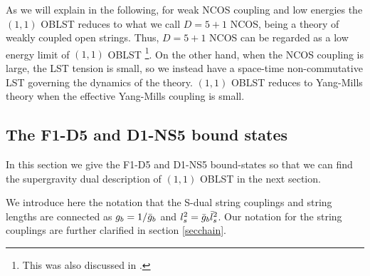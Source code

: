 \documentclass[a4paper,twoside,titlepage,12pt]{article}
\begin{document}
As we will explain in the following, 
for weak NCOS coupling and low energies the 
$(1,1)$ OBLST reduces to what we call
$D=5+1$ NCOS, being a theory of weakly coupled open strings.
Thus, $D=5+1$ NCOS can be regarded as a low energy limit of $(1,1)$ OBLST%
\footnote{This was also discussed in \cite{Harmark:2000wv}.}.
On the other hand, when the NCOS coupling is large, the LST tension
is small, so we instead have a space-time non-commutative 
LST governing the dynamics of the theory.
$(1,1)$ OBLST reduces to Yang-Mills theory when the effective Yang-Mills
coupling is small.

\subsection{The F1-D5 and D1-NS5 bound states}

In this section we give the F1-D5 and D1-NS5 bound-states 
so that we can find the supergravity dual description 
of $(1,1)$ OBLST in the next section.

We introduce here the notation that 
the S-dual string couplings and string lengths are connected
as \( g_b = 1 / \bar{g}_b \) and \( l_s^2 = \bar{g}_b \bar{l}_s^2 \).
Our notation for the string couplings are further clarified
in section \ref{secchain}.
\end{document}
